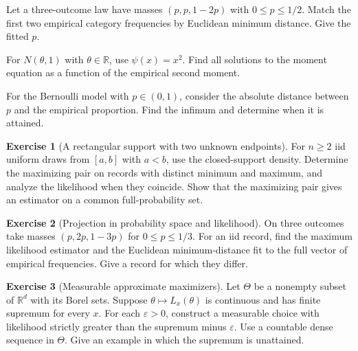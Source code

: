 \documentclass[11pt,oneside]{book}
\theoremstyle{definition}
\newtheorem{exercise}{Exercise}[section]
\theoremstyle{remark}
\newcommand{\R}{\mathbb R}
\begin{document}
\begin{practiceexercise}
\label{pex:mom-simplex-line-projection}
Let a three-outcome law have masses $(p,p,1-2p)$ with
$0\leq p\leq1/2$. Match the first two empirical category
frequencies by Euclidean minimum distance. Give the fitted $p$.
\end{practiceexercise}

\begin{practiceexercise}
\label{pex:mom-even-moment-normal-sign}
For $N(\theta,1)$ with $\theta\in\R$, use $\psi(x)=x^2$.
Find all solutions to the moment equation as a function of
the empirical second moment.
\end{practiceexercise}

\begin{practiceexercise}
\label{pex:mom-open-bernoulli-distance}
For the Bernoulli model with $p\in(0,1)$, consider the absolute
distance between $p$ and the empirical proportion. Find the
infimum and determine when it is attained.
\end{practiceexercise}

\begin{exercise}[A rectangular support with two unknown endpoints]
\label{exer:ml-uniform-two-endpoints}
For $n\geq2$ iid uniform draws from $[a,b]$ with $a<b$, use the
closed-support density. Determine the maximizing pair on records
with distinct minimum and maximum, and analyze the likelihood
when they coincide. Show that the maximizing pair gives an
estimator on a common full-probability set.
\end{exercise}

\begin{exercise}[Projection in probability space and likelihood]
\label{exer:ml-three-outcomes-two-criteria}
On three outcomes take masses $(p,2p,1-3p)$ for $0\leq p\leq1/3$.
For an iid record, find the maximum likelihood estimator
and the Euclidean minimum-distance fit to the full vector
of empirical frequencies. Give a record for which they differ.
\end{exercise}

\begin{exercise}[Measurable approximate maximizers]
\label{exer:ml-measurable-approximate-maximizers}
Let $\Theta$ be a nonempty subset of $\R^d$ with its Borel sets.
Suppose $\theta\mapsto L_x(\theta)$ is continuous and has finite
supremum for every $x$. For each $\varepsilon>0$, construct a
measurable choice with likelihood strictly greater than the
supremum minus $\varepsilon$. Use a countable dense sequence
in $\Theta$. Give an example in which the supremum is unattained.
\end{exercise}
\end{document}
